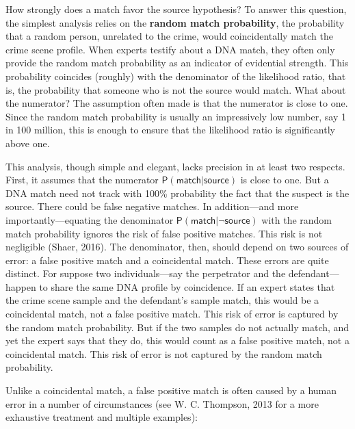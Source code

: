 \documentclass[
  10pt,
  dvipsnames,enabledeprecatedfontcommands]{scrartcl}
\newcommand{\raf}[1]{\todo[color=olive!40]{#1}}
\newcommand{\pr}[1]{\mathsf{P}(#1)}
\begin{document}
\noindent How strongly does a match favor the source hypothesis? To
answer this question, the simplest analysis relies on the
\textbf{random match probability}, the probability that a random person,
unrelated to the crime, would coincidentally match the crime scene
profile. When experts testify about a DNA match, they often only provide
the random match probability as an indicator of evidential strength.
This probability coincides (roughly) with the denominator of the
likelihood ratio, that is, the probability that someone who is not the
source would match. What about the numerator? The assumption often made
is that the numerator is close to one. Since the random match
probability is usually an impressively low number, say 1 in 100 million,
this is enough to ensure that the likelihood ratio is significantly
above one.

This analysis, though simple and elegant, lacks precision in at least
two respects. First, it assumes that the numerator
\(\pr{\textsf{match} \vert \textsf{source}}\) is close to one. But a DNA
match need not track with 100\% probability the fact that the suspect is
the source. There could be false negative matches. In addition---and
more importantly---equating the denominator
\(\pr{\textsf{match} \vert \neg \textsf{source}}\) with the random match
probability ignores the risk of false positive matches. This risk is not
negligible (Shaer, 2016). The denominator, then, should depend on two
sources of error: a false positive match and a coincidental match. These
errors are quite distinct. For suppose two individuals---say the
perpetrator and the defendant---happen to share the same DNA profile by
coincidence. If an expert states that the crime scene sample and the
defendant's sample match, this would be a coincidental match, not a
false positive match. This risk of error is captured by the random match
probability. But if the two samples do not actually match, and yet the
expert says that they do, this would count as a false positive match,
not a coincidental match. This risk of error is not captured by the
random match probability.

Unlike a coincidental match, a false positive match is often caused by a
human error in a number of circumstances (see W. C. Thompson, 2013 for a
more exhaustive treatment and multiple examples):

\raf{A: Bib references are missing here, is it on purpose?}
\end{document}
